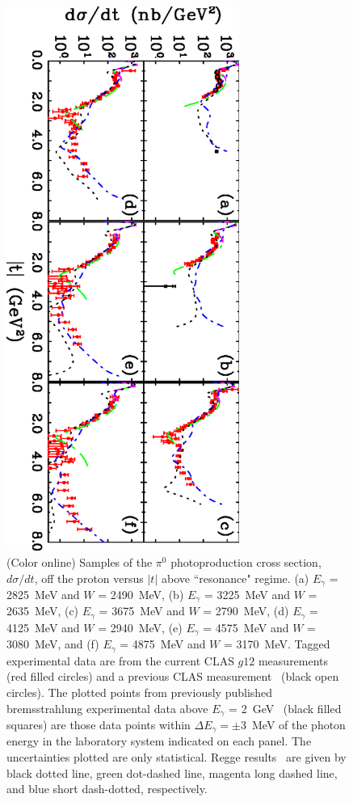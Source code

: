 \documentclass[aps,prc,twocolumn,floatfix,showpacs,preprintnumbers,amsmath,amssymb,superscriptaddress,linenumbers]{revtex4-1}
\begin{document}
\begin{figure}[htb!]
\centerline{
        \includegraphics[width=3in, angle=90]{dsdt.eps}}

        \caption {(Color online) Samples of the $\pi^0$ photoproduction 
	cross section, $d\sigma/dt$, off the proton versus $|t|$ 
	above ``resonance" regime.  
	(a) $E_{\gamma}$ = 2825~MeV and $W$ = 2490~MeV, 
	(b) $E_{\gamma} $ = 3225~MeV and $W$ = 2635~MeV,
	(c) $E_{\gamma}$ = 3675~MeV and $W$ = 2790~MeV, 
	(d) $E_{\gamma}$ = 4125~MeV and $W$ = 2940~MeV,
	(e) $E_{\gamma}$ = 4575~MeV and $W$ = 3080~MeV, and
	(f) $E_{\gamma}$ = 4875~MeV and $W$ = 3170~MeV.
	Tagged experimental data are from the current CLAS $g12$ measurements (red 
	filled circles) and a previous CLAS 
	measurement~\protect\cite{Dugger:2007bt} (black open circles). 
	The plotted points from previously published bremsstrahlung 
	experimental data above $E_{\gamma}$ = 2~GeV~\protect\cite{brem} (black 
	filled squares) are those data points within $\Delta E_{\gamma} = 
	\pm$3~MeV of the photon energy in the laboratory system 
	indicated on each panel. The uncertainties plotted are only 
	statistical. 
	Regge results~\protect\cite{Goldstein:1973xn,
	Mathieu:2015eia,Donnachie:2015jaa,Laget:2005be} are given by black dotted line, 
	green dot-dashed line, magenta long 
	dashed line, and blue short dash-dotted, respectively.} 
	\label{fig:t_data}
\end{figure}
\end{document}
